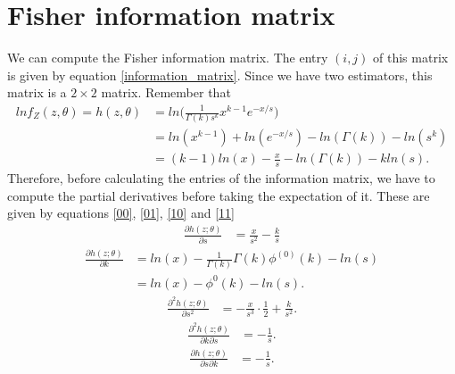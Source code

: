 \documentclass[final]{aomart}
\newtheorem[{}\it]{thm}{Theorem}[section]
\theoremstyle{definition}
\newtheorem*[{}\it]{notation}{Notation}
\numberwithin{equation}{section}
\begin{document}
\section{Fisher information matrix}
We can compute the Fisher information matrix. The entry $(i,j)$ of this matrix is given by equation \ref{information_matrix}. Since we have two estimators, this matrix is a $2\times 2$ matrix. Remember that
\begin{equation}
	\begin{aligned}
	lnf_Z(z,\theta) = h(z,\theta) & = ln\bigg( \frac{1}{\Gamma(k)s^k}x^{k-1}e^{-x/s} \bigg)\\
						   & = ln(x^{k-1}) + ln(e^{-x/s}) - ln(\Gamma(k)) - ln(s^k)\\
						   & = (k-1)ln(x) - \frac{x}{s} - ln(\Gamma(k)) - kln(s).
	\end{aligned}
\end{equation}
Therefore, before calculating the entries of the information matrix, we have to compute the partial derivatives before taking the expectation of it. These are given by equations \ref{00}, \ref{01}, \ref{10} and \ref{11}
\begin{equation}
	\begin{aligned}
	\frac{\partial h(z;\theta)}{\partial s} & = \frac{x}{s^2} - \frac{k}{s}
	\end{aligned}
\end{equation}
\begin{equation}
	\begin{aligned}
	\frac{\partial h(z;\theta)}{\partial k} & = ln(x) - \frac{1}{\Gamma(k)}\Gamma(k)\phi^{(0)}(k) - ln(s)\\
														  & = ln(x) - \phi^{0}(k) - ln(s).
	\end{aligned}
\end{equation}
\begin{equation}
	\begin{aligned}
	\frac{\partial^2h(z;\theta)}{\partial s^2} & = -\frac{x}{s^3}\cdot\frac{1}{2} + \frac{k}{s^2}.
	\end{aligned}
	\label{00}
\end{equation}
\begin{equation}
	\begin{aligned}
	\frac{\partial^2 h(z;\theta)}{\partial k \partial s} & = -\frac{1}{s}.
	\end{aligned}
	\label{01}
\end{equation}
\begin{equation}
	\begin{aligned}
	\frac{\partial h(z; \theta)}{\partial s \partial k} & = -\frac{1}{s}.
	\end{aligned}
	\label{10}
\end{equation}
\end{document}
